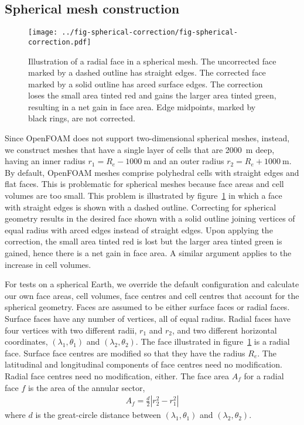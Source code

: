 \subsection*{Spherical mesh construction}

\begin{figure}
	\centering
	\texttt{[image: ../fig-spherical-correction/fig-spherical-correction.pdf]}
	\caption{Illustration of a radial face in a spherical mesh.  The uncorrected face marked by a dashed outline has straight edges.  The corrected face marked by a solid outline has arced surface edges.
	The correction loses the small area tinted red and gains the larger area tinted green, resulting in a net gain in face area.
	Edge midpoints, marked by black rings, are not corrected.}
	\label{fig:spherical-correction}
\end{figure}

Since OpenFOAM does not support two-dimensional spherical meshes, instead, we construct meshes that have a single layer of cells that are \SI{2000}{\meter} deep, having an inner radius $r_1 = R_e - \SI{1000}{\meter}$ and an outer radius $r_2 = R_e + \SI{1000}{\meter}$.  
By default, OpenFOAM meshes comprise polyhedral cells with straight edges and flat faces.  This is problematic for spherical meshes because face areas and cell volumes are too small.  This problem is illustrated by figure~\ref{fig:spherical-correction} in which a face with straight edges is shown with a dashed outline.
Correcting for spherical geometry results in the desired face shown with a solid outline joining vertices of equal radius with arced edges instead of straight edges.  Upon applying the correction, the small area tinted red is lost but the larger area tinted green is gained, hence there is a net gain in face area.  A similar argument applies to the increase in cell volumes.

For tests on a spherical Earth, we override the default configuration and calculate our own face areas, cell volumes, face centres and cell centres that account for the spherical geometry.  
Faces are assumed to be either surface faces or radial faces.  Surface faces have any number of vertices, all of equal radius.  Radial faces have four vertices with two different radii, $r_1$ and $r_2$, and two different horizontal coordinates, $(\lambda_1, \theta_1)$ and $(\lambda_2, \theta_2)$.  The face illustrated in figure~\ref{fig:spherical-correction} is a radial face.
Surface face centres are modified so that they have the radius $R_e$.  The latitudinal and longitudinal components of face centres need no modification.  Radial face centres need no modification, either.
The face area $A_f$ for a radial face $f$ is the area of the annular sector,
\begin{align}
	A_f = \frac{d}{2} \left\lvert r_2^2 - r_1^2 \right\rvert
\end{align}
where $d$ is the great-circle distance between $(\lambda_1, \theta_1)$ and $(\lambda_2, \theta_2)$.

